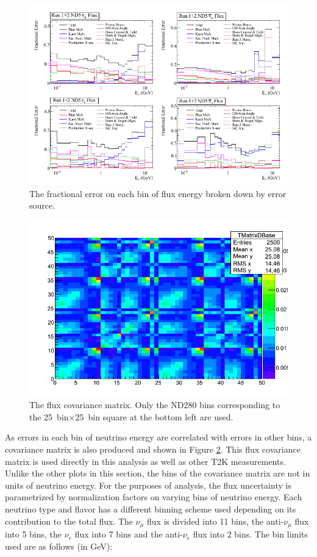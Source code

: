 \begin{figure}
\centering
\includegraphics[width=6.5in]{Figures/flux/fracuncertainty.PNG}
\caption{The fractional error on each bin of flux energy broken down by error source.} 
\label{fig:fracuncertainty}
\end{figure}

\begin{figure}
\centering
\includegraphics[width=6in]{Figures/flux_cov_init.png}
\caption{The flux covariance matrix. Only the ND280 bins corresponding to the 25~bin$\times$25~bin square at the bottom left are used.}
\label{fig:fluxcov}
\end{figure}

As errors in each bin of neutrino energy are correlated with errors in other bins, a covariance matrix is also produced and shown in Figure \ref{fig:fluxcov}. This flux covariance matrix is used directly in this analysis as well as other T2K measurements. Unlike the other plots in this section, the bins of the covariance matrix are not in units of neutrino energy. For the purposes of analysis, the flux uncertainty is parametrized by normalization factors on varying bins of neutrino energy. Each neutrino type and flavor has a different binning scheme used depending on its contribution to the total flux. The $\nu_\mu$ flux is divided into 11 bins, the anti-$\nu_\mu$ flux into 5 bins, the $\nu_e$ flux into 7 bins and the anti-$\nu_e$ flux into 2 bins. The bin limits used are as follows (in GeV):

